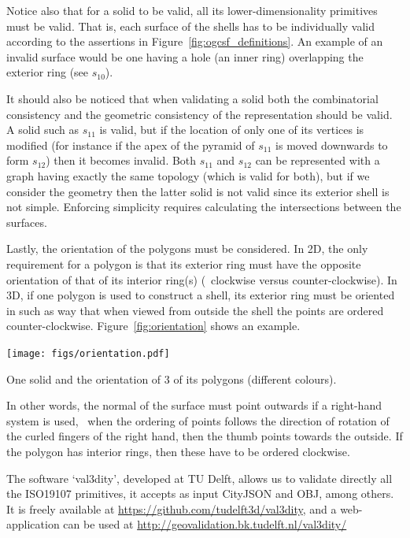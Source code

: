 Notice also that for a solid to be valid, all its lower-dimensionality primitives must be valid.
That is, each surface of the shells has to be individually valid according to the assertions in Figure~\ref{fig:ogcsf_definitions}.
An example of an invalid surface would be one having a hole (an inner ring) overlapping the exterior ring (see $s_{10}$).

It should also be noticed that when validating a solid both the combinatorial consistency and the geometric consistency of the representation should be valid.
A solid such as $s_{11}$ is valid, but if the location of only one of its vertices is modified (for instance if the apex of the pyramid of $s_{11}$ is moved downwards to form $s_{12}$) then it becomes invalid. 
Both $s_{11}$ and $s_{12}$ can be represented with a graph having exactly the same topology (which is valid for both), but if we consider the geometry then the latter solid is not valid since its exterior shell is not simple.
Enforcing simplicity requires calculating the intersections between the surfaces.

Lastly, the orientation of the polygons must be considered.
In 2D, the only requirement for a polygon is that its exterior ring must have the opposite orientation of that of its interior ring(s) (\eg\ clockwise versus counter-clockwise).
In 3D, if one polygon is used to construct a shell, its exterior ring must be oriented in such as way that when viewed from outside the shell the points are ordered counter-clockwise.
Figure~\ref{fig:orientation} shows an example.
\begin{marginfigure}
  \centering
  \texttt{[image: figs/orientation.pdf]}
  \caption{One solid and the orientation of 3 of its polygons (different colours).}%
\label{fig:orientation}
\end{marginfigure}
In other words, the normal of the surface must point outwards if a right-hand system is used, \ie\ when the ordering of points follows the direction of rotation of the curled fingers of the right hand, then the thumb points towards the outside.
If the polygon has interior rings, then these have to be ordered clockwise.


\begin{kaobox}[frametitle=\faCog\ How does it work in practice?]
  The software `val3dity', developed at TU Delft, allows us to validate directly all the ISO19107 primitives, it accepts as input CityJSON and OBJ, among others.
  It is freely available at \url{https://github.com/tudelft3d/val3dity}, and a web-application can be used at \url{http://geovalidation.bk.tudelft.nl/val3dity/}
\end{kaobox}

